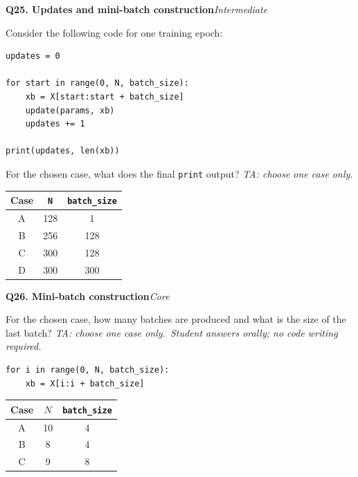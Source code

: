 \documentclass[11pt]{article}
\newif\ifshowanswers
\newenvironment{question}[3]{%
  \par\medskip
  \noindent\textbf{Q#1. #2}\hfill\textit{#3}\par\smallskip
}{\par\medskip}
\newcommand{\answer}[1]{%
  \ifshowanswers
    \begin{quote}\small\textbf{Expected answer:} #1\end{quote}
  \fi
}
\newcommand{\marking}[1]{%
  \ifshowanswers
    \begin{quote}\small\textbf{1 mark:} #1\end{quote}
  \fi
}
\newcommand{\casesnote}{\textit{TA: choose one case only.}}
\newcommand{\oralnote}{\textit{Student answers orally; no code writing required.}}
\begin{document}
\begin{question}{25}{Updates and mini-batch construction}{Intermediate}
Consider the following code for one training epoch:

\begin{verbatim}
updates = 0

for start in range(0, N, batch_size):
    xb = X[start:start + batch_size]
    update(params, xb)
    updates += 1

print(updates, len(xb))
\end{verbatim}

For the chosen case, what does the final \texttt{print} output? \casesnote

\begin{center}
\begin{tabular}{ccc}
\toprule
Case & \texttt{N} & \texttt{batch\_size} \\
\midrule
A & 128 & 1 \\
B & 256 & 128 \\
C & 300 & 128 \\
D & 300 & 300 \\
\bottomrule
\end{tabular}
\end{center}

\answer{
A: \texttt{128 1}. There are 128 SGD updates. \\
B: \texttt{2 128}. There are two complete mini-batches. \\
C: \texttt{3 44}. The first two batches contain 128 samples and the final
batch contains 44. \\
D: \texttt{1 300}. This is one full-batch update.
}

\marking{Student gives both the correct number of updates and the size of the
final batch for the chosen case.}
\end{question}

\begin{question}{26}{Mini-batch construction}{Core}
For the chosen case, how many batches are produced and what is the size of the last batch? \casesnote \ \oralnote

\begin{lstlisting}
for i in range(0, N, batch_size):
    xb = X[i:i + batch_size]
\end{lstlisting}

\begin{center}
\begin{tabular}{ccc}
\toprule
Case & $N$ & \texttt{batch\_size} \\
\midrule
A & 10 & 4 \\
B & 8 & 4 \\
C & 9 & 8 \\
\bottomrule
\end{tabular}
\end{center}

\answer{A: 3 batches, last size 2. B: 2 batches, last size 4. C: 2 batches, last size 1.}
\marking{Correct number of batches and final-batch size.}
\end{question}
\end{document}
